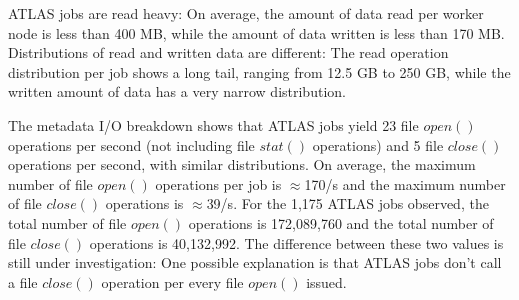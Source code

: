 
ATLAS jobs are read heavy: On average, the amount of data read per worker node
is less than 400 MB, while the amount of data written is less than 170 MB.
Distributions of read and written data are different: The read operation
distribution per job shows a long tail, ranging from 12.5 GB to 250 GB, while
the written amount of data has a very narrow distribution.

%

The metadata I/O breakdown shows that ATLAS jobs yield 23 file $open()$
operations per second (not including file $stat()$ operations) and 5 file $close()$ operations per second, with similar distributions.
On average, the maximum number of file $open()$ operations per job is
$\approx$170/s and the maximum number of file $close()$ operations is
$\approx$39/s.
For the 1,175 ATLAS jobs observed, the total number of file $open()$ operations
is 172,089,760 and the total number of file $close()$ operations is 40,132,992.
The difference between these two values is still under investigation: One
possible explanation is that ATLAS jobs don't call a file $close()$ operation
per every file $open()$ issued.

